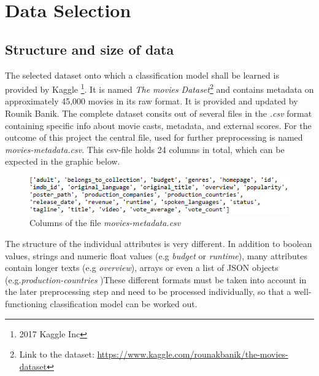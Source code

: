 \chapter{Data Selection}
\label{cha:data_selection}

\section{Structure and size of data}
The selected dataset onto which a classification model shall be learned is provided by Kaggle \footnote{2017 Kaggle Inc}. It is named \textit{The movies Dataset}\footnote{Link to the dataset: \hyperref[https://www.kaggle.com/rounakbanik/the-movies-dataset]{https://www.kaggle.com/rounakbanik/the-movies-dataset}} and contains metadata on approximately 45,000 movies in its raw format. It is provided and updated by Rounik Banik. The complete dataset consits out of several files in the \textit{.csv} format containing specific info about movie casts, metadata, and external scores. For the outcome of this project the central file, used for further preprocessing is named \textit{movies-metadata.csv}. This csv-file holds 24 columns in total, which can be expected in the graphic below.
\begin{figure}[ht]
	\centering
		\includegraphics[width=\textwidth]{images/Raw_dataset_headers.png}
	\caption{Columns of the file \textit{movies-metadata.csv}}
\end{figure}


The structure of the individual attributes is very different. In addition to boolean values, strings and numeric float values (e.g \textit{budget} or \textit{runtime}), many attributes contain longer texts (e.g \textit{overview}), arrays or even a list of JSON objects (e.g.\textit{production-countries} )These different formats must be taken into account in the later preprocessing step and need to be processed individually, so that a well-functioning classification model can be worked out.


